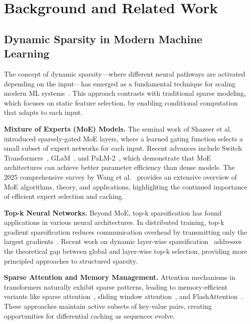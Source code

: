 \documentclass{article}
\numberwithin{equation}{section}
\theoremstyle{plain}
\theoremstyle{definition}
\theoremstyle{remark}
\begin{document}
\section{Background and Related Work} \label{sec:background}

\subsection{Dynamic Sparsity in Modern Machine Learning}

The concept of dynamic sparsity—where different neural pathways are activated depending on the input—has emerged as a fundamental technique for scaling modern ML systems~\cite{dynamic2024neurips}. This approach contrasts with traditional sparse modeling, which focuses on static feature selection, by enabling conditional computation that adapts to each input.

\textbf{Mixture of Experts (MoE) Models.} The seminal work of Shazeer et al.~\cite{shazeer2017outrageously} introduced sparsely-gated MoE layers, where a learned gating function selects a small subset of expert networks for each input. Recent advances include Switch Transformers~\cite{fedus2022switch}, GLaM~\cite{du2022glam}, and PaLM-2~\cite{anil2023palm}, which demonstrate that MoE architectures can achieve better parameter efficiency than dense models. The 2025 comprehensive survey by Wang et al.~\cite{wang2025comprehensive} provides an extensive overview of MoE algorithms, theory, and applications, highlighting the continued importance of efficient expert selection and caching.

\textbf{Top-k Neural Networks.} Beyond MoE, top-k sparsification has found applications in various neural architectures. In distributed training, top-k gradient sparsification reduces communication overhead by transmitting only the largest gradients~\cite{alistarh2018convergence}. Recent work on dynamic layer-wise sparsification~\cite{tang2023dynamic} addresses the theoretical gap between global and layer-wise top-k selection, providing more principled approaches to structured sparsity.

\textbf{Sparse Attention and Memory Management.} Attention mechanisms in transformers naturally exhibit sparse patterns, leading to memory-efficient variants like sparse attention~\cite{child2019generating}, sliding window attention~\cite{zaheer2020big}, and FlashAttention~\cite{dao2022flashattention}. These approaches maintain active subsets of key-value pairs, creating opportunities for differential caching as sequences evolve.
\end{document}
